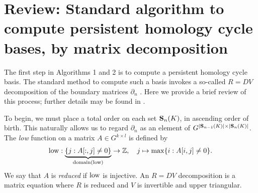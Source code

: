 \documentclass[utf8]{frontiers_suppmat} %
\begin{document}
\onecolumn
{}

\title[Supplementary Material]{{}}


\maketitle


\section{Review: Standard algorithm to compute persistent homology cycle bases, by matrix decomposition}
\label{sec:computingcyclereps}

The first step in Algorithms 1 and 2 is to compute a persistent homology cycle basis.  The standard method to compute such a basis invokes a so-called $R = DV$ decomposition  of the boundary matrices $\partial_n$ \cite{cohen2006vines}.  Here we  provide a brief review of this process; further details may be found in \cite{cohen2006vines, SMVDualities11}.
  
  To begin, we must place a total order on each set $\mathbf{S}_n(K)$, in ascending order of birth.  This naturally allows us to regard $\partial_n$ as an element of $G^{|\mathbf{S}_{n-1}(K)| \times |\mathbf{S}_{n}(K)|}$.  The \emph{low}  function on a matrix $A \in G^{k \times l}$ is defined by
    \begin{align*}
        \mathrm{low}: \underbrace{\{j : A[:,j] \neq 0 \}}_{\mathrm{domain}(\mathrm{low})} \to \mathbb{Z}, \quad j \mapsto \max \{i : A[i,j] \neq 0 \}.
    \end{align*}
We say that $A$ is \emph{reduced} if $\mathrm{low}$ is injective.  An $R = DV$ decomposition is a matrix equation where $R$ is reduced and $V$ is invertible and upper triangular.
\end{document}
